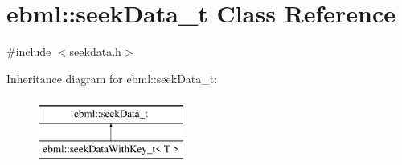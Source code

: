 \hypertarget{classebml_1_1seekData__t}{}\section{ebml\+:\+:seek\+Data\+\_\+t Class Reference}
\label{classebml_1_1seekData__t}


{\ttfamily \#include $<$seekdata.\+h$>$}

Inheritance diagram for ebml\+:\+:seek\+Data\+\_\+t\+:\begin{figure}[H]
\begin{center}
\leavevmode
\includegraphics[height=2.000000cm]{classebml_1_1seekData__t}
\end{center}
\end{figure}
